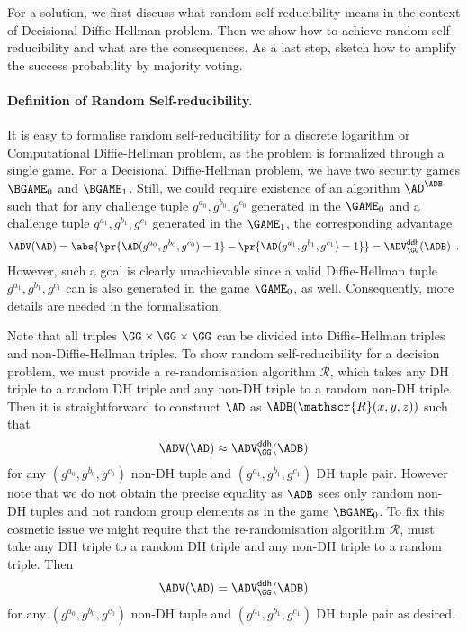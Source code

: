 \documentclass{crypto-exercise}
\newcommand{\RERAND}{\mathscr{R}}
\begin{document}
\begin{solution}  
  For a solution, we first discuss what random self-reducibility means
  in the context of Decisional Diffie-Hellman problem. Then we show
  how to achieve random self-reducibility and what are the
  consequences. As a last step, sketch how to amplify the success
  probability by majority voting.  



\paragraph{Definition of Random Self-reducibility.}
It is easy to formalise random self-reducibility for a discrete logarithm or Computational Diffie-Hellman problem, as the problem is formalized through a single game. 
For a Decisional Diffie-Hellman problem, we have two security games $\BGAME_0$ and $\BGAME_1$. 
Still, we could require existence of an algorithm $\AD^{\ADB}$ such that for any challenge tuple $g^{a_0},g^{b_0},g^{c_0}$ generated in the $\GAME_0$ and a challenge tuple $g^{a_1},g^{b_1},g^{c_1}$ generated in the $\GAME_1$, the corresponding advantage
\begin{align*}
    \ADV(\AD)=\abs{\pr{\smash{\AD(g^{a_0},g^{b_0},g^{c_0})=1}}-\pr{\smash{\AD(g^{a_1},g^{b_1},g^{c_1})=1}}}
    =\ADVDDH{\GG}{\ADB}\enspace.
\end{align*}
However, such a goal is clearly unachievable since a valid Diffie-Hellman tuple $g^{a_1},g^{b_1},g^{c_1}$ can is also generated in the game $\GAME_0$, as well.
Consequently, more details are needed in the formalisation.

Note that all triples $\GG\times\GG\times\GG$ can be divided into Diffie-Hellman triples and non-Diffie-Hellman triples. To show random self-reducibility for a decision problem, we must provide a re-randomisation algorithm $\RERAND$, which takes any DH triple to a random DH triple and any non-DH triple to a random non-DH triple. Then it is straightforward to construct $\AD$ as $\ADB(\RERAND(x,y,z))$ such that
\begin{align*}
 \ADV(\AD)\approx \ADVDDH{\GG}{\ADB}
\end{align*}
for any $(g^{a_0},g^{b_0},g^{c_0})$  non-DH tuple and $(g^{a_1},g^{b_1},g^{c_1})$  DH tuple pair. 
However note that we do not obtain the precise equality as $\ADB$ sees only random non-DH tuples and not random group elements as in the game $\BGAME_0$.
To fix this cosmetic issue we might require that the  re-randomisation algorithm $\RERAND$, must take any DH triple to a random DH triple and any non-DH triple to a random triple. Then 
\begin{align*}
 \ADV(\AD) = \ADVDDH{\GG}{\ADB}
\end{align*}
for any $(g^{a_0},g^{b_0},g^{c_0})$  non-DH tuple and $(g^{a_1},g^{b_1},g^{c_1})$  DH tuple pair as desired.
  

\end{solution}
\end{document}
